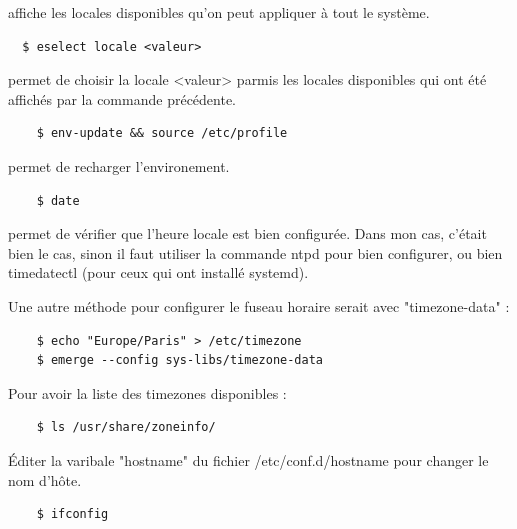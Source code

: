\documentclass{report}
\begin{document}
affiche les locales disponibles qu'on peut appliquer à tout le système.


\begin{tcolorbox}
  \begin{verbatim}
  $ eselect locale <valeur>
  \end{verbatim}
\end{tcolorbox}

permet de choisir la locale <valeur> parmis les locales disponibles qui ont été affichés par la commande précédente.


\begin{tcolorbox}
  \begin{verbatim}
    $ env-update && source /etc/profile
  \end{verbatim}
\end{tcolorbox}

permet de recharger l'environement.


\begin{tcolorbox}
  \begin{verbatim}
    $ date
  \end{verbatim}
\end{tcolorbox}

permet de vérifier que l'heure locale est bien configurée. Dans mon cas, c'était bien le cas, sinon il faut
utiliser la commande ntpd pour bien configurer, ou bien timedatectl (pour ceux qui ont installé systemd).

Une autre méthode pour configurer le fuseau horaire serait avec "timezone-data" :
\newpage

\begin{tcolorbox}
  \begin{verbatim}
    $ echo "Europe/Paris" > /etc/timezone
    $ emerge --config sys-libs/timezone-data
  \end{verbatim}
\end{tcolorbox}
Pour avoir la liste des timezones disponibles :
\begin{tcolorbox}
  \begin{verbatim}
    $ ls /usr/share/zoneinfo/
  \end{verbatim}
\end{tcolorbox}

Éditer la varibale "hostname" du fichier /etc/conf.d/hostname pour changer le nom d'hôte.

\begin{tcolorbox}
  \begin{verbatim}
    $ ifconfig
  \end{verbatim}
\end{tcolorbox}
\end{document}
